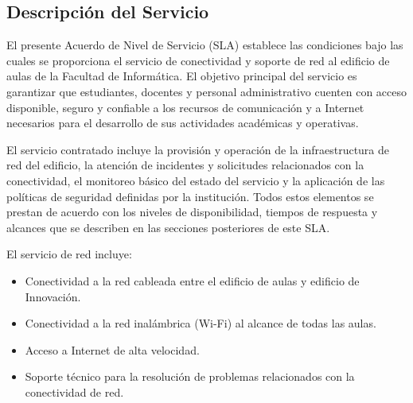 
\subsection{Descripción del Servicio}

El presente Acuerdo de Nivel de Servicio (SLA) establece las condiciones bajo las cuales se proporciona el servicio de conectividad y soporte de red al edificio de aulas de la Facultad de Informática. El objetivo principal del servicio es garantizar que estudiantes, docentes y personal administrativo cuenten con acceso disponible, seguro y confiable a los recursos de comunicación y a Internet necesarios para el desarrollo de sus actividades académicas y operativas.

El servicio contratado incluye la provisión y operación de la infraestructura de red del edificio, la atención de incidentes y solicitudes relacionados con la conectividad, el monitoreo básico del estado del servicio y la aplicación de las políticas de seguridad definidas por la institución. Todos estos elementos se prestan de acuerdo con los niveles de disponibilidad, tiempos de respuesta y alcances que se describen en las secciones posteriores de este SLA.

El servicio de red incluye:
\begin{itemize}
    \item Conectividad a la red cableada entre el edificio de aulas y edificio de Innovaci\'on.
    \item Conectividad a la red inalámbrica (Wi-Fi) al alcance de todas las aulas.
    \item Acceso a Internet de alta velocidad.
    \item Soporte técnico para la resolución de problemas relacionados con la conectividad de red.
\end{itemize}
